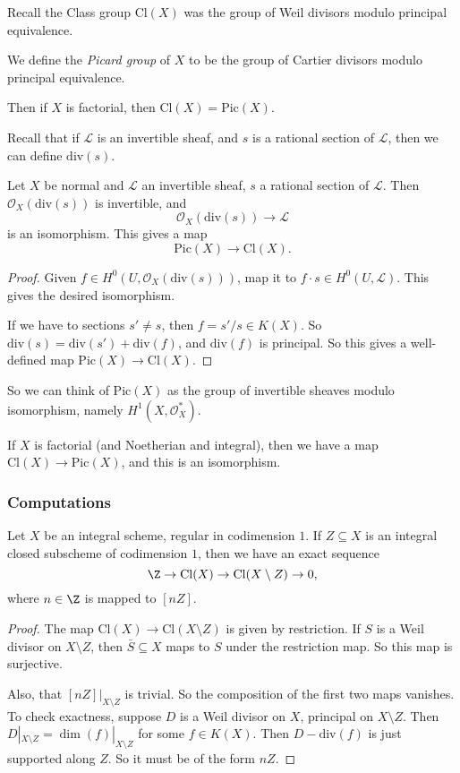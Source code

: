 \documentclass[a4paper]{article}
\renewcommand\div{\mathrm{div}}
\newcommand\Cl{\mathrm{Cl}}
\newcommand\Pic{\mathrm{Pic}}
\begin{document}
Recall the Class group $\Cl(X)$ was the group of Weil divisors modulo principal equivalence.
\begin{defi}
  We define the \emph{Picard group} of $X$ to be the group of Cartier divisors modulo principal equivalence.
\end{defi}
Then if $X$ is factorial, then $\Cl(X) = \Pic(X)$.

Recall that if $\mathcal{L}$ is an invertible sheaf, and $s$ is a rational section of $\mathcal{L}$, then we can define $\div(s)$.

\begin{prop}
  Let $X$ be normal and $\mathcal{L}$ an invertible sheaf, $s$ a rational section of $\mathcal{L}$. Then $\mathcal{O}_X(\div(s))$ is invertible, and
  \[
    \mathcal{O}_X(\div(s)) \to \mathcal{L}
  \]
  is an isomorphism. This gives a map
  \[
    \Pic(X) \to \Cl(X).
  \]
\end{prop}

\begin{proof}
  Given $f \in H^0(U, \mathcal{O}_X(\div(s)))$, map it to $f \cdot s \in H^0(U, \mathcal{L})$. This gives the desired isomorphism.

  If we have to sections $s' \not= s$, then $f= s'/s \in K(X)$. So $\div(s) = \div (s') + \div(f)$, and $\div(f)$ is principal. So this gives a well-defined map $\Pic(X) \to \Cl(X)$.
\end{proof}
So we can think of $\Pic(X)$ as the group of invertible sheaves modulo isomorphism, namely $H^1(X, \mathcal{O}_X^*)$.

If $X$ is factorial (and Noetherian and integral), then we have a map $\Cl(X) \to \Pic(X)$, and this is an isomorphism.

\subsubsection*{Computations}
\begin{prop}
  Let $X$ be an integral scheme, regular in codimension $1$. If $Z \subseteq X$ is an integral closed subscheme of codimension $1$, then we have an exact sequence
  \[
    \Z \to \Cl(X) \to \Cl(X \setminus Z) \to 0,
  \]
  where $n \in \Z$ is mapped to $[nZ]$.
\end{prop}

\begin{proof}
  The map $\Cl(X) \to \Cl(X \setminus Z)$ is given by restriction. If $S$ is a Weil divisor on $X \setminus Z$, then $\bar{S} \subseteq X$ maps to $S$ under the restriction map. So this map is surjective.

  Also, that $[nZ]|_{X \setminus Z}$ is trivial. So the composition of the first two maps vanishes. To check exactness, suppose $D$ is a Weil divisor on $X$, principal on $X \setminus Z$. Then $D|_{X \setminus Z} = \dim(f)|_{X \setminus Z}$ for some $f \in K(X)$. Then $D - \div(f)$ is just supported along $Z$. So it must be of the form $nZ$.
\end{proof}
\end{document}
